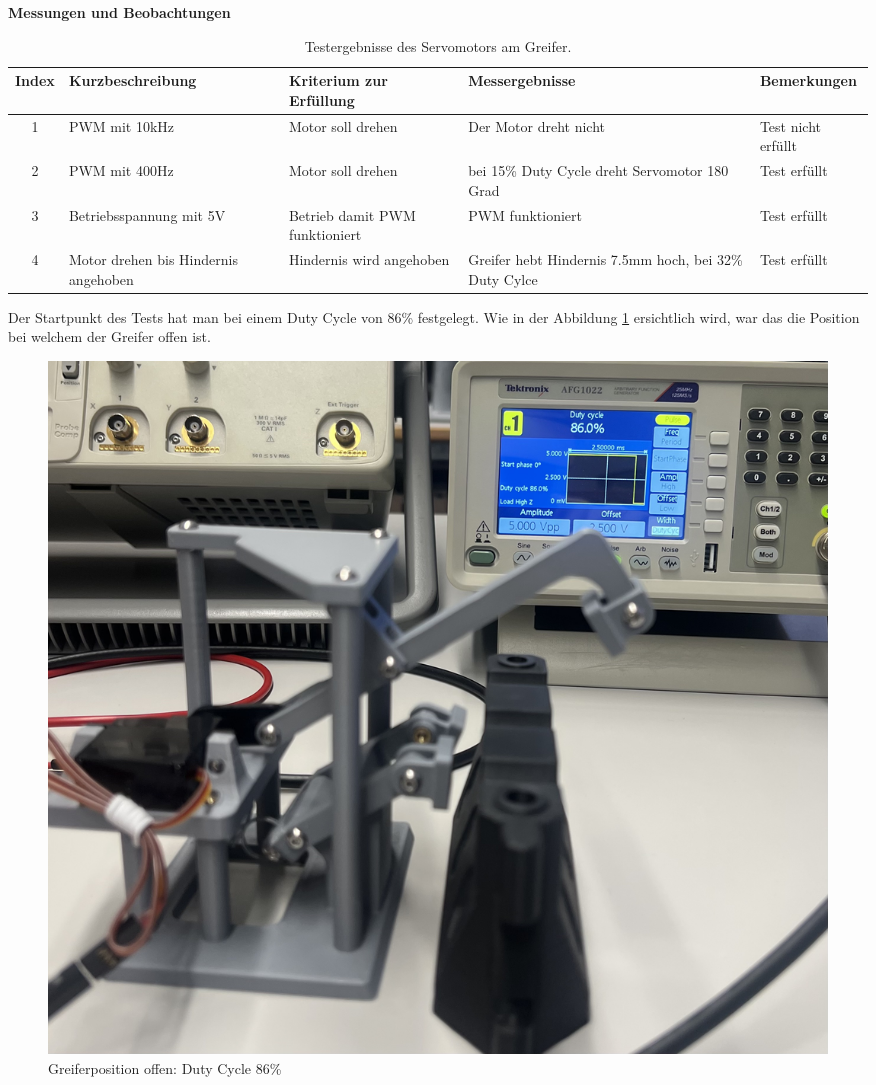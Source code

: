 \textbf{Messungen und Beobachtungen}

\begin{table}[H]
\centering
\small
\begin{tabularx}{\textwidth}{|c|X|X|X|l|}
        \hline
        \textbf{Index} & \textbf{Kurzbeschreibung} & \textbf{Kriterium zur Erfüllung} & \textbf{Messergebnisse} & \textbf{Bemerkungen} \\
        \hline \hline
        1 & PWM mit 10kHz & Motor soll drehen & Der Motor dreht nicht & Test nicht erfüllt \\ \hline
        2 & PWM mit 400Hz & Motor soll drehen & bei 15\% Duty Cycle dreht Servomotor 180 Grad & Test erfüllt \\ \hline
        3 & Betriebsspannung mit 5V & Betrieb damit PWM funktioniert  & PWM funktioniert & Test erfüllt\\ \hline
        4 & Motor drehen bis Hindernis angehoben & Hindernis wird angehoben & Greifer hebt Hindernis 7.5mm hoch, bei 32\% Duty Cylce & Test erfüllt \\ \hline
\end{tabularx}
    \caption{Testergebnisse des Servomotors am Greifer.}
\label{tab:testpunkte Servomotor}
\end{table}

\newpage

Der Startpunkt des Tests hat man bei einem Duty Cycle von 86\% festgelegt. Wie in der Abbildung \ref{fig: Greiferposition offen: Duty Cycle 86} ersichtlich wird, war das die Position bei welchem der Greifer offen ist.

\begin{figure}[H]
    \centering
    \includegraphics[width=0.8\linewidth]{img/ServoGreifferoffen.jpeg}
    \caption{Greiferposition offen: Duty Cycle 86\%}
    \label{fig: Greiferposition offen: Duty Cycle 86}
\end{figure}



